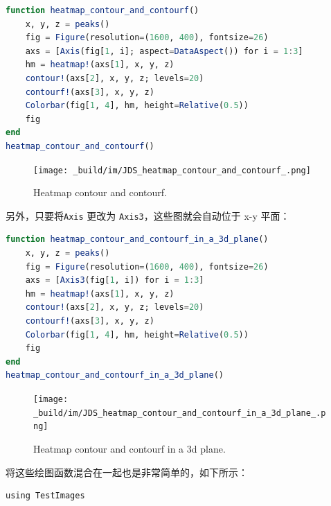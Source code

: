 \documentclass[
  notoc %
]{tufte-book}
\newcommand{\passthrough}[1]{#1}
\begin{document}
\begin{lstlisting}[language=Julia]
function heatmap_contour_and_contourf()
    x, y, z = peaks()
    fig = Figure(resolution=(1600, 400), fontsize=26)
    axs = [Axis(fig[1, i]; aspect=DataAspect()) for i = 1:3]
    hm = heatmap!(axs[1], x, y, z)
    contour!(axs[2], x, y, z; levels=20)
    contourf!(axs[3], x, y, z)
    Colorbar(fig[1, 4], hm, height=Relative(0.5))
    fig
end
heatmap_contour_and_contourf()
\end{lstlisting}

\begin{figure}
\hypertarget{fig:heatmap_contour_and_contourf}{%
\centering
\texttt{[image: \_build/im/JDS\_heatmap\_contour\_and\_contourf\_.png]}
\caption{Heatmap contour and
contourf.}\label{fig:heatmap_contour_and_contourf}
}
\end{figure}

另外，只要将\passthrough{\lstinline!Axis!} 更改为
\passthrough{\lstinline!Axis3!}，这些图就会自动位于 x-y 平面：

\begin{lstlisting}[language=Julia]
function heatmap_contour_and_contourf_in_a_3d_plane()
    x, y, z = peaks()
    fig = Figure(resolution=(1600, 400), fontsize=26)
    axs = [Axis3(fig[1, i]) for i = 1:3]
    hm = heatmap!(axs[1], x, y, z)
    contour!(axs[2], x, y, z; levels=20)
    contourf!(axs[3], x, y, z)
    Colorbar(fig[1, 4], hm, height=Relative(0.5))
    fig
end
heatmap_contour_and_contourf_in_a_3d_plane()
\end{lstlisting}

\begin{figure}
\hypertarget{fig:heatmap_contour_and_contourf_in_a_3d_plane}{%
\centering
\texttt{[image: \_build/im/JDS\_heatmap\_contour\_and\_contourf\_in\_a\_3d\_plane\_.png]}
\caption{Heatmap contour and contourf in a 3d
plane.}\label{fig:heatmap_contour_and_contourf_in_a_3d_plane}
}
\end{figure}

将这些绘图函数混合在一起也是非常简单的，如下所示：

\begin{lstlisting}
using TestImages
\end{lstlisting}
\end{document}
